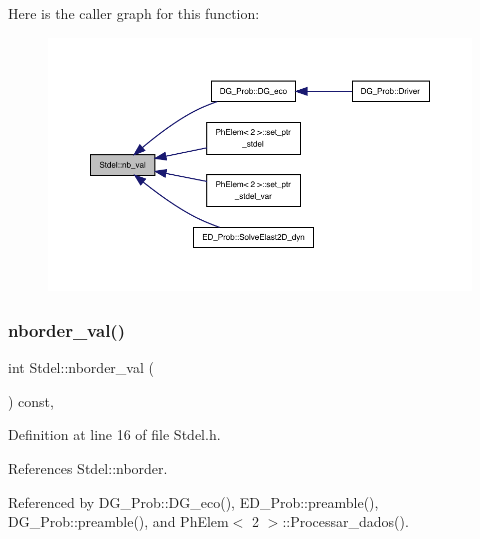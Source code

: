 Here is the caller graph for this function\+:
\nopagebreak
\begin{figure}[H]
\begin{center}
\leavevmode
\includegraphics[width=350pt]{classStdel_a4fb0a049dc27d8e67665a56d1b5a18ba_icgraph}
\end{center}
\end{figure}
\mbox{\label{classStdel_aac8e97661e46c48fafa91f13caa03a9f}} 
\subsubsection{\texorpdfstring{nborder\+\_\+val()}{nborder\_val()}}
{\footnotesize\ttfamily int Stdel\+::nborder\+\_\+val (\begin{DoxyParamCaption}{ }\end{DoxyParamCaption}) const\hspace{0.3cm}{\ttfamily [inline]}, {\ttfamily [inherited]}}



Definition at line 16 of file Stdel.\+h.



References Stdel\+::nborder.



Referenced by D\+G\+\_\+\+Prob\+::\+D\+G\+\_\+eco(), E\+D\+\_\+\+Prob\+::preamble(), D\+G\+\_\+\+Prob\+::preamble(), and Ph\+Elem$<$ 2 $>$\+::\+Processar\+\_\+dados().

